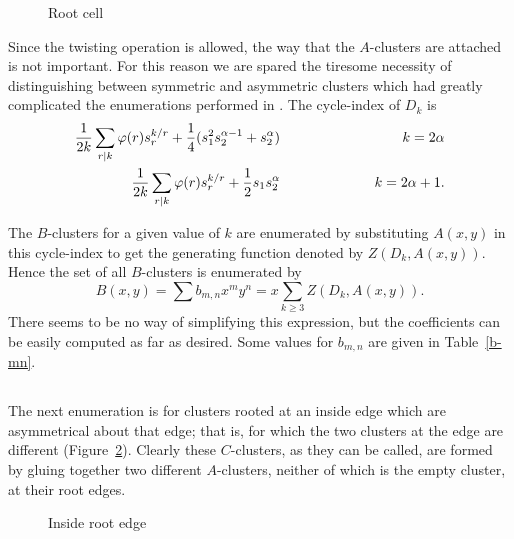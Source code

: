 \documentclass[10pt]{amsart}
\begin{document}
\begin{figure}[h]
\caption{Root cell}
\label{rootcell}
\end{figure}

Since the twisting operation is allowed, the way that the $A$-clusters are attached is not important.  For this reason we are spared the tiresome necessity of distinguishing between symmetric and asymmetric clusters which had greatly complicated the enumerations performed in \cite{r1}. The cycle-index of $D_k$ is
\begin{eqnarray*}
\frac{1}{2k}\sum_{r|k}\varphi(r)s_r^{k/r}+ \frac{1}{4}(s_1^2s_2^{\alpha-1}+s_2^\alpha) & \hspace{.8in} & k = 2\alpha \\
\frac{1}{2k}\sum_{r|k}\varphi(r)s_r^{k/r}+\frac{1}{2}s_1s_2^\alpha & \hspace{.8in} & k = 2\alpha + 1. \\
\end{eqnarray*}

\vspace{-.2in}
\noindent The $B$-clusters for a given value of $k$ are enumerated by substituting $A(x, y)$ in this cycle-index to get the generating function denoted by $Z(D_k, A(x,y))$.   Hence the set of all $B$-clusters is enumerated by
$$B(x, y)  =  \sum b_{m,n} x^m y^n = x \sum_{k\geq 3} Z(D_k, A(x, y)).$$
There seems to be no way of simplifying this expression, but the coefficients can be easily computed as far as desired.  Some values for $b_{m,n}$ are given in Table~\ref{b-mn}.


\subsection{}
The next enumeration is for clusters rooted at an inside edge which are asymmetrical about that edge; that is, for which the two clusters at the edge are different (Figure~\ref{irootedge}).  Clearly these $C$-clusters, as they can be called, are formed by gluing together two different $A$-clusters, neither of which is the empty cluster, at their root edges. 

\begin{figure}[h]
\caption{Inside root edge}
\label{irootedge}
\end{figure}
\end{document}

